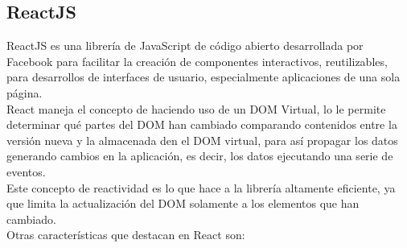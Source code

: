     \subsection{ReactJS}

        ReactJS es una librería de JavaScript de código abierto desarrollada por Facebook para facilitar la creación de componentes interactivos, reutilizables, para desarrollos de interfaces de usuario, especialmente aplicaciones de una sola página.\\

        React maneja el concepto de  haciendo uso de un DOM Virtual, lo le permite determinar qué partes del DOM han cambiado comparando contenidos entre la versión nueva y la almacenada den el DOM virtual, para así propagar los datos generando cambios en la aplicación, es decir, los datos  ejecutando una serie de eventos.\\

        Este concepto de reactividad es lo que hace a la librería altamente eficiente, ya que limita la actualización del DOM solamente a los elementos que han cambiado.\\

        Otras características que destacan en React son:\\

